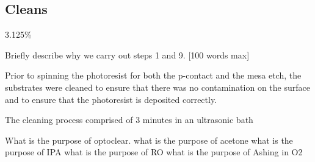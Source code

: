 \subsection{Cleans}
\label{sec:fab:cleans}

3.125\%

Briefly describe why we carry out steps 1 and 9. [100 words max]

Prior to spinning the photoresist for both the p-contact and the mesa etch, the substrates were cleaned to ensure that there was no contamination on the surface and to ensure that the photoresist is deposited correctly.

The cleaning process comprised of 3 minutes in an ultrasonic bath

What is the purpose of optoclear.
what is the purpose of acetone
what is the purpose of IPA
what is the purpose of RO
what is the purpose of Ashing in O2
